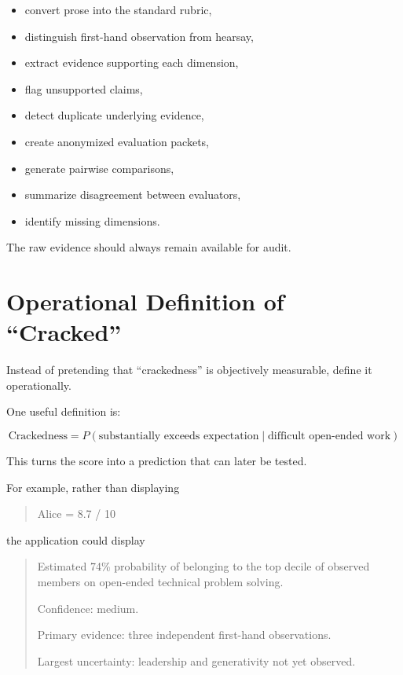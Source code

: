 \documentclass[11pt]{article}
\begin{document}
\begin{itemize}
    \item convert prose into the standard rubric,
    \item distinguish first-hand observation from hearsay,
    \item extract evidence supporting each dimension,
    \item flag unsupported claims,
    \item detect duplicate underlying evidence,
    \item create anonymized evaluation packets,
    \item generate pairwise comparisons,
    \item summarize disagreement between evaluators,
    \item identify missing dimensions.
\end{itemize}

The raw evidence should always remain available for audit.

\section{Operational Definition of ``Cracked''}

Instead of pretending that ``crackedness'' is objectively measurable, define it
operationally.

One useful definition is:

\[
\boxed{
\text{Crackedness}
=
P(
\text{substantially exceeds expectation}
\mid
\text{difficult open-ended work}
)
}
\]

This turns the score into a prediction that can later be tested.

For example, rather than displaying

\begin{quote}
Alice = 8.7 / 10
\end{quote}

the application could display

\begin{quote}
Estimated 74\% probability of belonging to the top decile of observed members
on open-ended technical problem solving.

Confidence: medium.

Primary evidence: three independent first-hand observations.

Largest uncertainty: leadership and generativity not yet observed.
\end{quote}
\end{document}
